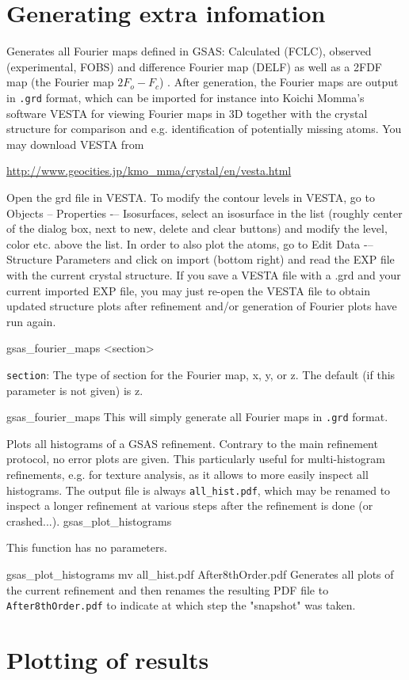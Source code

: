 \section{Generating extra infomation}

{
Generates all Fourier maps defined in GSAS: Calculated (FCLC), observed (experimental, FOBS) and difference Fourier map (DELF) as well as a 2FDF map (the Fourier map $2F_o-F_c$) . After generation, the Fourier maps are output in \texttt{.grd} format, which can be imported for instance into Koichi Momma's software VESTA for viewing Fourier maps in 3D together with the crystal structure for comparison and e.g. identification of potentially missing atoms. You may download VESTA from

\url{http://www.geocities.jp/kmo_mma/crystal/en/vesta.html}

Open the grd file in VESTA. To modify the contour levels in VESTA, go to Objects -- Properties -– Isosurfaces, select an isosurface in the list (roughly center of the dialog box, next to new, delete and clear buttons) and modify the level, color etc. above the list. In order to also plot the atoms, go to Edit Data -– Structure Parameters and click on import (bottom right) and read the EXP file with the current crystal structure. If you save a VESTA file with a .grd and your current imported EXP file, you may just re-open the VESTA file to obtain updated structure plots after refinement and/or generation of Fourier plots have run again.
}{
gsas\_fourier\_maps <section>
}{
\item \texttt{section}: The type of section for the Fourier map, x, y, or z. The default (if this parameter is not given) is z.
}{
gsas\_fourier\_maps
}{
This will simply generate all Fourier maps in \texttt{.grd} format.
}

{
Plots all histograms of a GSAS refinement. Contrary to the main refinement protocol, no error plots are given. This particularly useful for multi-histogram refinements, e.g. for texture analysis, as it allows to more easily inspect all histograms. The output file is always \texttt{all\_hist.pdf}, which may be renamed to inspect a longer refinement at various steps after the refinement is done (or crashed...).
}{
gsas\_plot\_histograms
}{
\item This function has no parameters.
}{
gsas\_plot\_histograms
mv all\_hist.pdf After8thOrder.pdf
}{
Generates all plots of the current refinement and then renames the resulting PDF file to \texttt{After8thOrder.pdf} to indicate at which step the "snapshot" was taken.
}

\section{Plotting of results}


